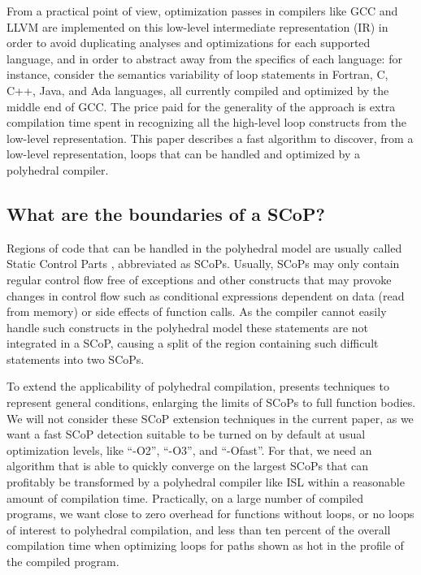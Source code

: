 \documentclass{sig-alternate}
\begin{document}
From a practical point of view, optimization passes in compilers like GCC and
LLVM are implemented on this low-level intermediate representation (IR) in order
to avoid duplicating analyses and optimizations for each supported language, and
in order to abstract away from the specifics of each language: for instance,
consider the semantics variability of loop statements in Fortran, C, C++, Java,
and Ada languages, all currently compiled and optimized by the middle end of
GCC.  The price paid for the generality of the approach is extra compilation
time spent in recognizing all the high-level loop constructs from the low-level
representation.  This paper describes a fast algorithm to discover, from a
low-level representation, loops that can be handled and optimized by a
polyhedral compiler.

\subsection{What are the boundaries of a SCoP?}

Regions of code that can be handled in the polyhedral model are usually called
Static Control Parts \cite{Girbal,Bondhugula}, abbreviated as SCoPs.  Usually,
SCoPs may only contain regular control flow free of exceptions and other
constructs that may provoke changes in control flow such as conditional
expressions dependent on data (read from memory) or side effects of function
calls.  As the compiler cannot easily handle such constructs in the polyhedral
model these statements are not integrated in a SCoP, causing a split of the
region containing such difficult statements into two SCoPs.

To extend the applicability of polyhedral compilation, \cite{scopExtend}
presents techniques to represent general conditions, enlarging the limits of
SCoPs to full function bodies.  We will not consider these SCoP extension
techniques in the current paper, as we want a fast SCoP detection suitable to be
turned on by default at usual optimization levels, like ``-O2'', ``-O3'', and
``-Ofast''.  For that, we need an algorithm that is able to quickly converge on
the largest SCoPs that can profitably be transformed by a polyhedral compiler
like ISL \cite{verdoolaege2010isl} within a reasonable amount of compilation
time.  Practically, on a large number of compiled programs, we want close to
zero overhead for functions without loops, or no loops of interest to polyhedral
compilation, and less than ten percent of the overall compilation time when
optimizing loops for paths shown as hot in the profile of the compiled program.
\end{document}
